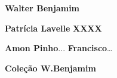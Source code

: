 \textbf{Walter Benjamim} \lipsum[1]


\textbf{\titulo} \lipsum[2]

\textbf{Patrícia Lavelle} \lipsum[3]
\textbf{XXXX} \lipsum[4]

\textbf{Amon Pinho}...
\textbf{Francisco}…

\textbf{Coleção W.Benjamim} \lipsum[6]


